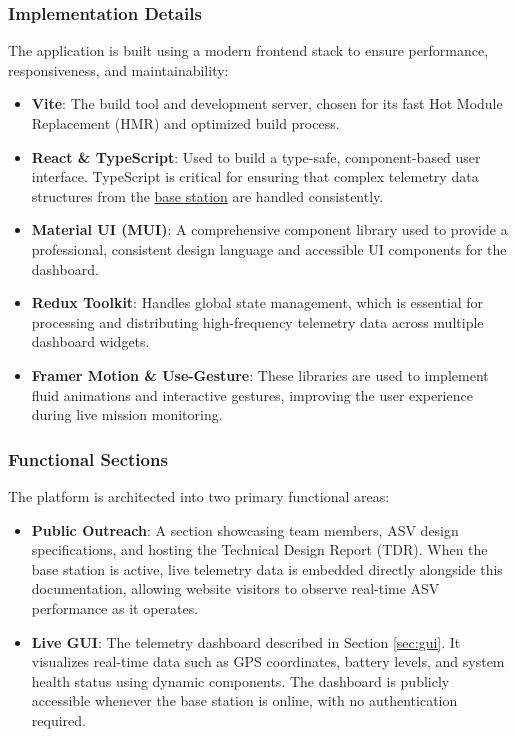 \subsubsection{Implementation Details}
The application is built using a modern frontend stack to ensure performance, responsiveness, and maintainability:
\begin{itemize}
    \item \textbf{Vite}: The build tool and development server, chosen for its fast Hot Module Replacement (HMR) and optimized build process.
    \item \textbf{React \& TypeScript}: Used to build a type-safe, component-based user interface. TypeScript is critical for ensuring that complex telemetry data structures from the \hyperref[sec:basestation]{base station} are handled consistently.
    \item \textbf{Material UI (MUI)}: A comprehensive component library used to provide a professional, consistent design language and accessible UI components for the dashboard.
    \item \textbf{Redux Toolkit}: Handles global state management, which is essential for processing and distributing high-frequency telemetry data across multiple dashboard widgets.
    \item \textbf{Framer Motion \& Use-Gesture}: These libraries are used to implement fluid animations and interactive gestures, improving the user experience during live mission monitoring.
\end{itemize}

\subsubsection{Functional Sections}
The platform is architected into two primary functional areas:
\begin{itemize}
    \item \textbf{Public Outreach}: A section showcasing team members, ASV design specifications, and hosting the Technical Design Report (TDR). When the base station is active, live telemetry data is embedded directly alongside this documentation, allowing website visitors to observe real-time ASV performance as it operates.
    \item \textbf{Live GUI}: The telemetry dashboard described in Section \ref{sec:gui}. It visualizes real-time data such as GPS coordinates, battery levels, and system health status using dynamic components. The dashboard is publicly accessible whenever the base station is online, with no authentication required.
\end{itemize}